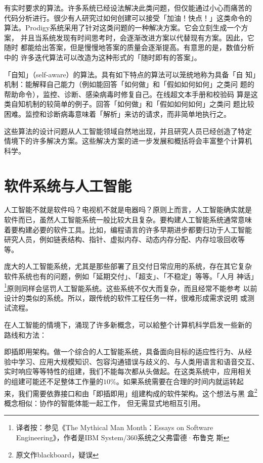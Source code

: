\documentclass[12pt,a4paper]{article}
\begin{document}
有实时要求的算法。许多系统已经设法解决此类问题，但仅能通过小心而痛苦的
代码分析进行。很少有人研究过如何创建可以接受「加油！快点！」这类命令的
算法。Prodigy系统采用了针对这类问题的一种解决方案。它会立刻生成一个方案，
并且当系统发现有时间思考时，会逐渐改进方案以代替现有方案。因此，它随时
都能给出答案，但是慢慢地答案的质量会逐渐提高。有意思的是，数值分析中的
许多迭代算法可以改造为这种形式的「随时即有的答案」。

「自知」（self-aware）的算法。具有如下特点的算法可以笼统地称为具备「自
知」机制：能解释自己能力（例如能回答「如何做」和「假如如何如何」之类问
题的帮助命令），监控、诊断、感染病毒时修复自己。在线超文本手册和校验码
算是这类自知机制的较简单的例子。回答「如何做」和「假如如何如何」之类问
题比较困难。监控和诊断病毒意味着「解析」来访的请求，而非简单地执行之。

这些算法的设计问题从人工智能领域自然地出现，并且研究人员已经创造了特定
情境下的许多解决方案。这些解决方案的进一步发展和概括将会丰富整个计算机
科学。

\section{软件系统与人工智能}

人工智能不就是软件吗？电视机不就是电器吗？原则上而言，人工智能确实就是
软件而已，虽然人工智能系统一般比较大且复杂。要构建人工智能系统通常意味
着要构建必要的软件工具。比如，编程语言的许多早期进步都要归功于人工智能
研究人员，例如链表结构、指针、虚拟内存、动态内存分配、内存垃圾回收等
等。

庞大的人工智能系统，尤其是那些部署了且交付日常应用的系统，存在其它复杂
软件系统也有的问题，例如「延期交付」、「超支」、「不稳定」等等。「人月
神话」\footnote{译者按：参见《The Mythical Man Month：Essays on
  Software Engineering》，作者是IBM System/360系统之父弗雷德·布鲁克
  斯}原则同样会惩罚人工智能系统。这些系统不仅大而复杂，而且经常不能参考
以前设计的类似的系统。所以，跟传统的软件工程任务一样，很难形成需求说明
或测试流程。

在人工智能的情境下，涌现了许多新概念，可以給整个计算机科学启发一些新的
路线和方法：

即插即用架构。做一个综合的人工智能系统，具备面向目标的适应性行为、从经
验中学习、应用大规模知识、包容沟通错误与歧义的、与人类用语言和语音交互、
实时响应等等特性的组建，我们不能每次都从头做起。在这类系统中，应用相关
的组建可能还不足整体工作量的$10\%$。如果系统需要在合理的时间内就运转起
来，我们需要依靠接口和由「即插即用」组建构成的软件架构。这个想法与黑
盒\footnote{原文作blackboard，疑误} 概念相似：协作的智能体能一起工作，
但无需显式地相互引用。
\end{document}
